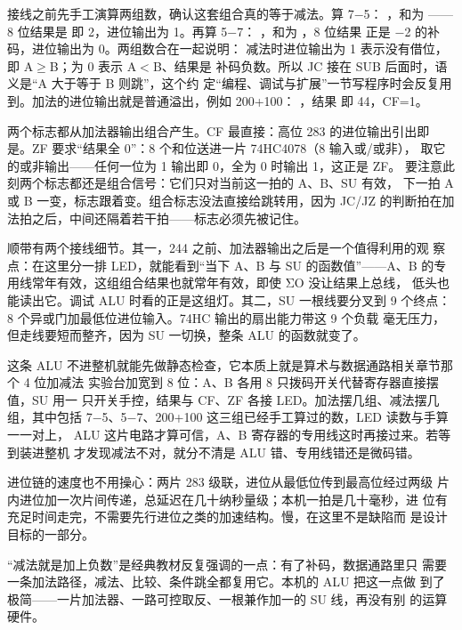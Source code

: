 接线之前先手工演算两组数，确认这套组合真的等于减法。算 7$-$5：
，和为 ——8 位结果是
 即 2，进位输出为 1。再算 5$-$7：
，和为 ，8 位结果
 正是 $-$2 的补码，进位输出为 0。两组数合在一起说明：
减法时进位输出为 1 表示没有借位，即 A$\geq$B；为 0 表示 A$<$B、结果是
补码负数。所以 JC 接在 SUB 后面时，语义是“A 大于等于 B 则跳”，这个约
定“编程、调试与扩展”一节写程序时会反复用到。加法的进位输出就是普通溢出，例如 200+100：
，结果  即 44，CF=1。

两个标志都从加法器输出组合产生。CF 最直接：高位 283 的进位输出引出即
是。ZF 要求“结果全 0”：8 个和位送进一片 74HC4078（8 输入或/或非），
取它的或非输出——任何一位为 1 输出即 0，全为 0 时输出 1，这正是 ZF。
要注意此刻两个标志都还是组合信号：它们只对当前这一拍的 A、B、SU 有效，
下一拍 A 或 B 一变，标志跟着变。组合标志没法直接给跳转用，因为 JC/JZ
的判断拍在加法拍之后，中间还隔着若干拍——标志必须先被记住。

顺带有两个接线细节。其一，244 之前、加法器输出之后是一个值得利用的观
察点：在这里分一排 LED，就能看到“当下 A、B 与 SU 的函数值”——A、B
的专用线常年有效，这组组合结果也就常年有效，即使 ΣO 没让结果上总线，
低头也能读出它。调试 ALU 时看的正是这组灯。其二，SU 一根线要分叉到 9
个终点：8 个异或门加最低位进位输入。74HC 输出的扇出能力带这 9 个负载
毫无压力，但走线要短而整齐，因为 SU 一切换，整条 ALU 的函数就变了。

这条 ALU 不进整机就能先做静态检查，它本质上就是算术与数据通路相关章节那个 4 位加减法
实验台加宽到 8 位：A、B 各用 8 只拨码开关代替寄存器直接摆值，SU 用一
只开关手控，结果与 CF、ZF 各接 LED。加法摆几组、减法摆几组，其中包括
7$-$5、5$-$7、200+100 这三组已经手工算过的数，LED 读数与手算一一对上，
ALU 这片电路才算可信，A、B 寄存器的专用线这时再接过来。若等到装进整机
才发现减法不对，就分不清是 ALU 错、专用线错还是微码错。

进位链的速度也不用操心：两片 283 级联，进位从最低位传到最高位经过两级
片内进位加一次片间传递，总延迟在几十纳秒量级；本机一拍是几十毫秒，进
位有充足时间走完，不需要先行进位之类的加速结构。慢，在这里不是缺陷而
是设计目标的一部分。

\begin{classicnote}
“减法就是加上负数”是经典教材反复强调的一点：有了补码，数据通路里只
需要一条加法路径，减法、比较、条件跳全都复用它。本机的 ALU 把这一点做
到了极简——一片加法器、一路可控取反、一根兼作加一的 SU 线，再没有别
的运算硬件。
\end{classicnote}

